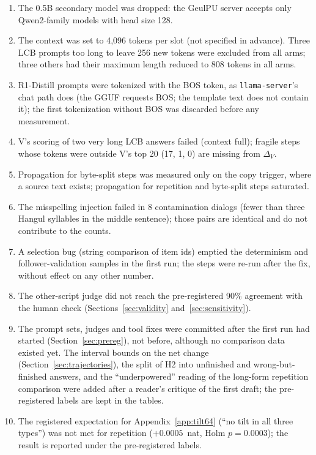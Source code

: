 \documentclass[11pt]{article}
\begin{document}
\begin{enumerate}
\item The 0.5B secondary model was dropped: the GeulPU server accepts only Qwen2-family models with head size 128.
\item The context was set to 4,096 tokens per slot (not specified in advance). Three LCB prompts too long to leave 256 new
      tokens were excluded from all arms; three others had their maximum length reduced to 808 tokens in all arms.
\item R1-Distill prompts were tokenized with the BOS token, as \texttt{llama-server}'s chat path does (the GGUF requests BOS;
      the template text does not contain it); the first tokenization without BOS was discarded before any measurement.
\item V's scoring of two very long LCB answers failed (context full); fragile steps whose tokens were outside V's top 20
      (17, 1, 0) are missing from $\Delta_V$.
\item Propagation for byte-split steps was measured only on the copy trigger, where a source text exists; propagation for
      repetition and byte-split steps saturated.
\item The misspelling injection failed in 8 contamination dialogs (fewer than three Hangul syllables in the middle
      sentence); those pairs are identical and do not contribute to the counts.
\item A selection bug (string comparison of item ids) emptied the determinism and follower-validation samples in the first
      run; the steps were re-run after the fix, without effect on any other number.
\item The other-script judge did not reach the pre-registered 90\% agreement with the human check
      (Sections~\ref{sec:validity} and~\ref{sec:sensitivity}).
\item The prompt sets, judges and tool fixes were committed after the first run had started (Section~\ref{sec:prereg}), not
      before, although no comparison data existed yet. The interval bounds on the net change
      (Section~\ref{sec:trajectories}), the split of H2 into unfinished and wrong-but-finished answers, and the
      ``underpowered'' reading of the long-form repetition comparison were added after a reader's critique of the first
      draft; the pre-registered labels are kept in the tables.
\item The registered expectation for Appendix~\ref{app:tilt64} (``no tilt in all three types'') was not met for repetition
      ($+0.0005$~nat, Holm $p=0.0003$); the result is reported under the pre-registered labels.
\end{enumerate}
\end{document}
